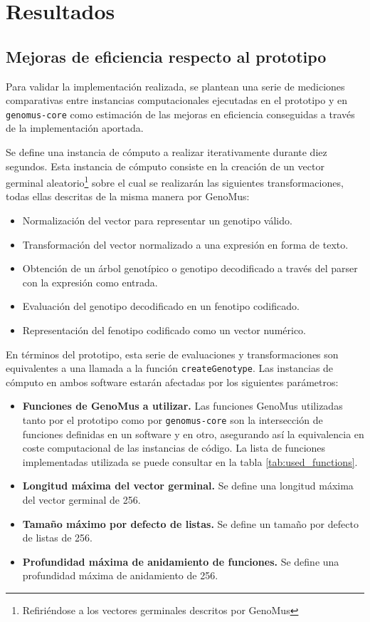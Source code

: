 \chapter{Resultados}

\section{Mejoras de eficiencia respecto al prototipo}

Para validar la implementación realizada, se plantean una serie de mediciones comparativas entre instancias computacionales ejecutadas en el prototipo y en \verb|genomus-core| como estimación de las mejoras en eficiencia conseguidas a través de la implementación aportada. 

Se define una instancia de cómputo a realizar iterativamente durante diez segundos. Esta instancia de cómputo consiste en la creación de un vector germinal aleatorio\footnote{Refiriéndose a los vectores germinales descritos por GenoMus\cite{GenoMus-master}} sobre el cual se realizarán las siguientes transformaciones, todas ellas descritas de la misma manera por GenoMus:

\begin{itemize}
    \item Normalización del vector para representar un genotipo válido.
    \item Transformación del vector normalizado a una expresión en forma de texto.
    \item Obtención de un árbol genotípico o genotipo decodificado a través del parser con la expresión como entrada.
    \item Evaluación del genotipo decodificado en un fenotipo codificado.
    \item Representación del fenotipo codificado como un vector numérico.
\end{itemize}

En términos del prototipo, esta serie de evaluaciones y transformaciones son equivalentes a una llamada a la función \verb|createGenotype|. Las instancias de cómputo en ambos software estarán afectadas por los siguientes parámetros:

\begin{itemize}
    \item \textbf{Funciones de GenoMus a utilizar.} Las funciones GenoMus utilizadas tanto por el prototipo como por \verb|genomus-core| son la intersección de funciones definidas en un software y en otro, asegurando así la equivalencia en coste computacional de las instancias de código. La lista de funciones implementadas utilizada se puede consultar en la tabla \ref{tab:used_functions}.
    
    \item \textbf{Longitud máxima del vector germinal.} Se define una longitud máxima del vector germinal de 256.
    \item \textbf{Tamaño máximo por defecto de listas.} Se define un tamaño por defecto de listas de 256.
    \item \textbf{Profundidad máxima de anidamiento de funciones.} Se define una profundidad máxima de anidamiento de 256.
\end{itemize}


